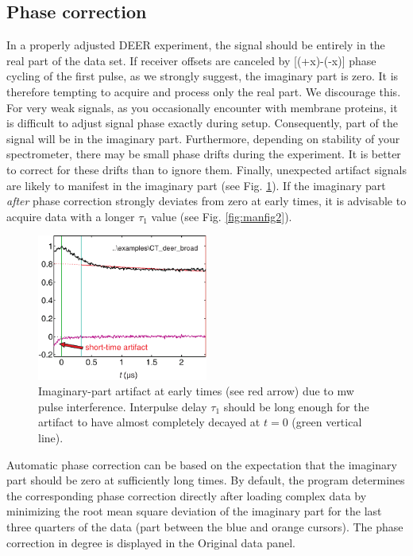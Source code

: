 \documentclass{article}
\begin{document}
\subsection{Phase correction}
In a properly adjusted DEER experiment, the signal should be entirely in the
real part of the data set. If receiver offsets are canceled by [(+x)-(-x)] phase
cycling of the first pulse, as we strongly suggest, the imaginary part is zero. It is
therefore tempting to acquire and process only the real part. We discourage this.
For very weak signals, as you occasionally encounter with membrane proteins,
it is difficult to adjust signal phase exactly during setup. Consequently, part of
the signal will be in the imaginary part. Furthermore, depending on stability
of your spectrometer, there may be small phase drifts during the experiment.
It is better to correct for these drifts than to ignore them. Finally, unexpected
artifact signals are likely to manifest in the imaginary part (see Fig. \ref{fig:manfig3}). If the imaginary part \emph{after} phase correction strongly deviates from zero at early times,
it is advisable to acquire data with a longer $\tau_1$ value (see Fig. \ref{fig:manfig2}).

\begin{figure}[ht]
 	\begin{center}
  \includegraphics[width=0.5\textwidth]{fig3.pdf}
	\end{center}
	\caption{Imaginary-part artifact at early times (see red arrow) due to mw pulse
interference. Interpulse delay $\tau_1$ should
be long enough for the artifact to have almost completely decayed at $t = 0$
(green vertical line).}
	\label{fig:manfig3}
\end{figure}

Automatic phase correction can be based on the expectation that the imaginary
part should be zero at sufficiently long times. By default, the program
determines the corresponding phase correction directly after loading complex
data by minimizing the root mean square deviation of the imaginary part for
the last three quarters of the data (part between the blue and orange cursors). The phase
correction in degree is displayed in the {\ttfamily Original
data} panel.
\end{document}

